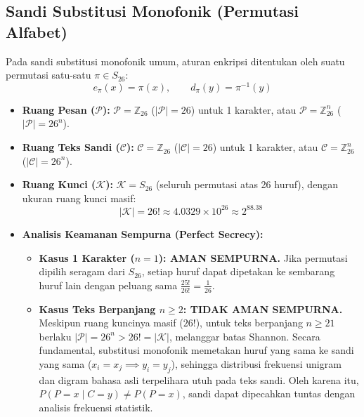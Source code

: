 \documentclass[11pt,a4paper]{article}
\begin{document}
\subsection{Sandi Substitusi Monofonik (Permutasi Alfabet)}
Pada sandi substitusi monofonik umum, aturan enkripsi ditentukan oleh suatu permutasi satu-satu $\pi \in S_{26}$:
\[
e_\pi(x) = \pi(x), \qquad d_\pi(y) = \pi^{-1}(y)
\]
\begin{itemize}[leftmargin=*]
    \item \textbf{Ruang Pesan ($\mathcal{P}$):} $\mathcal{P} = \mathbb{Z}_{26}$ ($|\mathcal{P}| = 26$) untuk 1 karakter, atau $\mathcal{P} = \mathbb{Z}_{26}^n$ ($|\mathcal{P}| = 26^n$).
    \item \textbf{Ruang Teks Sandi ($\mathcal{C}$):} $\mathcal{C} = \mathbb{Z}_{26}$ ($|\mathcal{C}| = 26$) untuk 1 karakter, atau $\mathcal{C} = \mathbb{Z}_{26}^n$ ($|\mathcal{C}| = 26^n$).
    \item \textbf{Ruang Kunci ($\mathcal{K}$):} $\mathcal{K} = S_{26}$ (seluruh permutasi atas 26 huruf), dengan ukuran ruang kunci masif:
    \[
    |\mathcal{K}| = 26! \approx 4.0329 \times 10^{26} \approx 2^{88.38}
    \]
    \item \textbf{Analisis Keamanan Sempurna (Perfect Secrecy):}
    \begin{itemize}
        \item \textbf{Kasus 1 Karakter ($n = 1$): AMAN SEMPURNA.} Jika permutasi dipilih seragam dari $S_{26}$, setiap huruf dapat dipetakan ke sembarang huruf lain dengan peluang sama $\frac{25!}{26!} = \frac{1}{26}$.
        \item \textbf{Kasus Teks Berpanjang $n \ge 2$: TIDAK AMAN SEMPURNA.} Meskipun ruang kuncinya masif ($26!$), untuk teks berpanjang $n \ge 21$ berlaku $|\mathcal{P}| = 26^n > 26! = |\mathcal{K}|$, melanggar batas Shannon. Secara fundamental, substitusi monofonik memetakan huruf yang sama ke sandi yang sama ($x_i = x_j \implies y_i = y_j$), sehingga distribusi frekuensi unigram dan digram bahasa asli terpelihara utuh pada teks sandi. Oleh karena itu, $P(P = x \mid C = y) \neq P(P = x)$, sandi dapat dipecahkan tuntas dengan analisis frekuensi statistik.
    \end{itemize}
\end{itemize}
\end{document}
